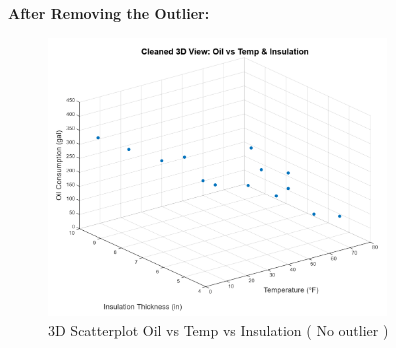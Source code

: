 \documentclass[12pt]{article}
\begin{document}
\textbf{After Removing the Outlier:}
\begin{figure}[h!]
    \centering
    \includegraphics[width=0.8\textwidth]{13.png}
    \caption{3D Scatterplot Oil vs Temp vs Insulation ( No outlier )}
\end{figure}
\end{document}

